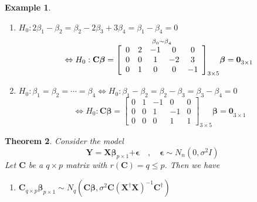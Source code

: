 \documentclass{article}
\newtheorem{theorem}{Theorem}
\newtheorem{example}[theorem]{Example}
\begin{document}
\begin{example}
\begin{enumerate}
\begin{enumerate}
\item $H_{0}:2\beta _{1}-\beta _{2}=\beta _{2}-2\beta _{3}+3\beta _{4}=\beta
_{1}-\beta _{4}=0$%
\begin{equation*}
\Leftrightarrow H_{0}:\mathbf{C\beta }=\overset{\beta _{0}\sim \beta _{4}}{%
\left[ 
\begin{array}{ccccc}
0 & 2 & -1 & 0 & 0 \\ 
0 & 0 & 1 & -2 & 3 \\ 
0 & 1 & 0 & 0 & -1%
\end{array}%
\right] }_{3\times 5}\mathbf{\beta =0}_{3\times 1}
\end{equation*}

\item $H_{0}:\beta _{1}=\beta _{2}=\cdots =\beta _{4}\Leftrightarrow
H_{0}:\beta _{1}-\beta _{2}=\beta _{2}-\beta _{3}=\beta _{3}-\beta _{4}=0$%
\begin{equation*}
\Leftrightarrow H_{0}:\mathbf{C\beta }=\left[ 
\begin{array}{ccccc}
0 & 1 & -1 & 0 & 0 \\ 
0 & 0 & 1 & -1 & 0 \\ 
0 & 0 & 0 & 1 & 1%
\end{array}%
\right] _{3\times 5}\mathbf{\beta =0}_{3\times 1}
\end{equation*}
\end{enumerate}
\end{enumerate}
\end{example}

\bigskip

\begin{theorem}
Consider the model%
\begin{equation*}
\mathbf{Y=X\beta }_{p\times 1}\mathbf{+\epsilon \quad ,\quad \epsilon }\sim
N_{n}\left( 0,\sigma ^{2}I\right) 
\end{equation*}%
Let $\mathbf{C}$ be a $q\times p$ matrix with $r\left( \mathbf{C}\right)
=q\leq p$. Then we have

\begin{enumerate}
\item $\mathbf{C}_{q\times p}\mathbf{\hat{\beta}}_{p\times 1}\sim
N_{q}\left( \mathbf{C\beta },\sigma ^{2}\mathbf{C}\left( \mathbf{X}^{\dagger
}\mathbf{X}\right) ^{-1}\mathbf{C}^{\dagger }\right) $
\end{enumerate}
\end{theorem}
\end{document}
